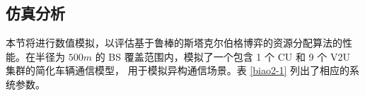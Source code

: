 \subsection{仿真分析}\label{section2-4-2}
本节将进行数值模拟，以评估基于鲁棒的斯塔克尔伯格博弈的资源分配算法的性能。在半径为 $500m$ 的 BS 覆盖范围内，模拟了一个包含 1 个 CU 和 9 个 V2U 集群的简化车辆通信模型，
用于模拟异构通信场景。表 \ref{biao2-1} 列出了相应的系统参数。

